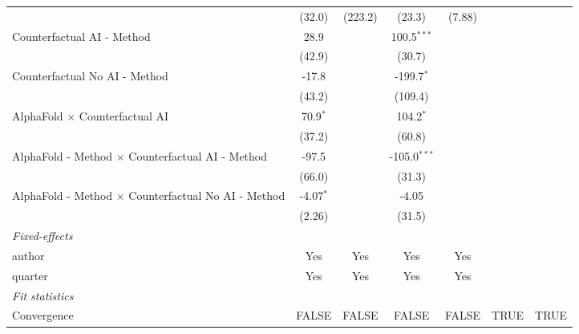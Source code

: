\begin{tabular}{lcccccc}
                                                              & (32.0)       & (223.2)     & (23.3)         & (7.88)       &      &   \\   
   Counterfactual AI - Method                                 & 28.9         &             & 100.5$^{***}$  &              &      &   \\   
                                                              & (42.9)       &             & (30.7)         &              &      &   \\   
   Counterfactual No AI - Method                              & -17.8        &             & -199.7$^{*}$   &              &      &   \\   
                                                              & (43.2)       &             & (109.4)        &              &      &   \\   
   AlphaFold $\times$ Counterfactual AI                       & 70.9$^{*}$   &             & 104.2$^{*}$    &              &      &   \\   
                                                              & (37.2)       &             & (60.8)         &              &      &   \\   
   AlphaFold - Method $\times$ Counterfactual AI - Method     & -97.5        &             & -105.0$^{***}$ &              &      &   \\   
                                                              & (66.0)       &             & (31.3)         &              &      &   \\   
   AlphaFold - Method $\times$ Counterfactual No AI - Method  & -4.07$^{*}$  &             & -4.05          &              &      &   \\   
                                                              & (2.26)       &             & (31.5)         &              &      &   \\   
   \midrule
   \emph{Fixed-effects}\\
   author                                                     & Yes          & Yes         & Yes            & Yes          &      & \\  
   quarter                                                    & Yes          & Yes         & Yes            & Yes          &      & \\  
   \midrule
   \emph{Fit statistics}\\
   Convergence                                                &FALSE         & FALSE       & FALSE          & FALSE        & TRUE & TRUE\\  

\end{tabular}
